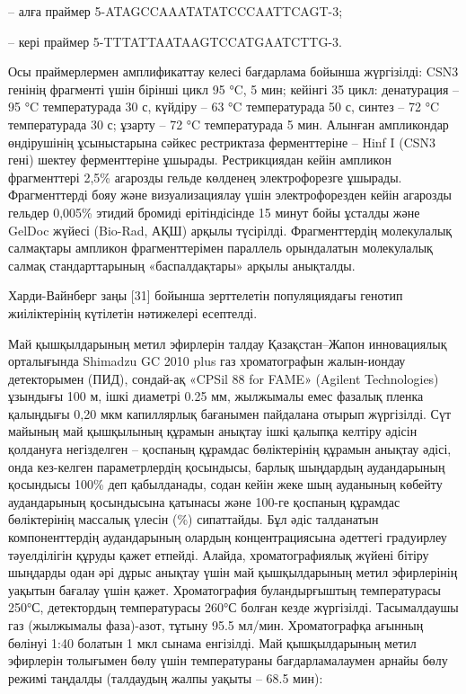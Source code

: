 -- алға праймер
5\textquotesingle-ATAGCCAAATATATCCCAATTCAGT-3\textquotesingle;

-- кері праймер 5\textquotesingle-TTTATTAATAAGTCCATGAATCTTG-3.

Осы праймерлермен амплификаттау келесі бағдарлама бойынша жүргізілді:
CSN3 генінің фрагменті үшін бірінші цикл 95 °C, 5 мин; кейінгі 35 цикл:
денатурация -- 95 °C температурада 30 с, күйдіру -- 63 °C температурада
50 с, синтез -- 72 °C температурада 30 с; ұзарту -- 72 °C температурада
5 мин. Алынған ампликондар өндірушінің ұсыныстарына сәйкес рестриктаза
ферменттеріне -- Hinf I (CSN3 гені) шектеу ферменттеріне ұшырады.
Рестрикциядан кейін ампликон фрагменттері 2,5\% агарозды гельде көлденең
электрофорезге ұшырады. Фрагменттерді бояу және визуализациялау үшін
электрофорезден кейін агарозды гельдер 0,005\% этидий бромиді
ерітіндісінде 15 минут бойы ұсталды және GelDoc жүйесі (Bio-Rad, АҚШ)
арқылы түсірілді. Фрагменттердің молекулалық салмақтары ампликон
фрагменттерімен параллель орындалатын молекулалық салмақ стандарттарының
«баспалдақтары» арқылы анықталды.

Харди-Вайнберг заңы {[}31{]} бойынша зерттелетін популяциядағы генотип
жиіліктерінің күтілетін нәтижелері есептелді.

Май қышқылдарының метил эфирлерін талдау Қазақстан--Жапон инновациялық
орталығында Shimadzu GC 2010 plus газ хроматографын жалын-иондау
детекторымен (ПИД), сондай-ақ «CPSil 88 for FAME» (Agilent Technologies)
ұзындығы 100 м, ішкі диаметрі 0.25 мм, жылжымалы емес фазалық пленка
қалыңдығы 0,20 мкм капиллярлық бағанымен пайдалана отырып жүргізілді.
Сүт майының май қышқылының құрамын анықтау ішкі қалыпқа келтіру әдісін
қолдануға негізделген -- қоспаның құрамдас бөліктерінің құрамын анықтау
әдісі, онда кез-келген параметрлердің қосындысы, барлық шыңдардың
аудандарының қосындысы 100\% деп қабылданады, содан кейін жеке шың
ауданының көбейту аудандарының қосындысына қатынасы және 100-ге қоспаның
құрамдас бөліктерінің массалық үлесін (\%) сипаттайды. Бұл әдіс
талданатын компоненттердің аудандарының олардың концентрациясына
әдеттегі градуирлеу тәуелділігін құруды қажет етпейді. Алайда,
хроматографиялық жүйені бітіру шыңдарды одан әрі дұрыс анықтау үшін май
қышқылдарының метил эфирлерінің уақытын бағалау үшін қажет.
Хроматография буландырғыштың температурасы 250°С, детектордың
температурасы 260°С болған кезде жүргізілді. Тасымалдаушы газ (жылжымалы
фаза)-азот, тұтыну 95.5 мл/мин. Хроматографқа ағынның бөлінуі 1:40
болатын 1 мкл сынама енгізілді. Май қышқылдарының метил эфирлерін
толығымен бөлу үшін температураны бағдарламалаумен арнайы бөлу режимі
таңдалды (талдаудың жалпы уақыты -- 68.5 мин):

